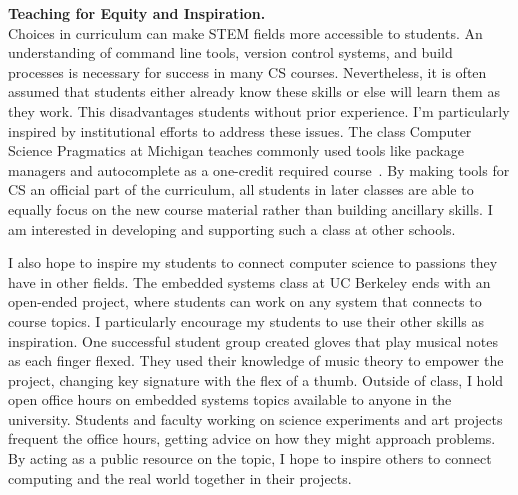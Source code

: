 \documentclass[11pt]{article} %
\begin{document}
\smallskip
\textbf{\textsf{\large Teaching for Equity and Inspiration.}}\\
%
Choices in curriculum can make STEM fields more accessible to students. 
%
An understanding of command line tools, version control systems, and build
processes is necessary for success in many CS courses. Nevertheless, it is
often assumed that students either already know these skills or else will learn
them as they work. This disadvantages students without prior experience.
%
%
I'm particularly inspired by institutional efforts to address these issues. The
class Computer Science Pragmatics at Michigan teaches commonly used tools like
package managers and autocomplete as a one-credit required
course~\footnotemark{}.
%
By making tools for CS an official part of the curriculum, all students in
later classes are able to equally focus on the new course material rather than
building ancillary skills.
%
I am interested in developing and supporting such a class at other schools.


I also hope to inspire my students to connect computer science
to passions they have in other fields.
%
The embedded systems class at UC Berkeley ends with an open-ended project, where
students can work on any system that connects to course topics. I
particularly encourage my students to use their other skills as inspiration.
%
One successful student group created gloves that play musical notes as each
finger flexed. They used their knowledge of music theory to empower the
project, changing key signature with the flex of a thumb.
%
Outside of class, I hold open office hours on embedded systems topics available
to anyone in the university. Students and faculty working on science
experiments and art projects frequent the office hours, getting advice on how
they might approach problems.
%
By acting as a public resource on the topic, I hope to inspire others to
connect computing and the real world together in their projects.
\end{document}
